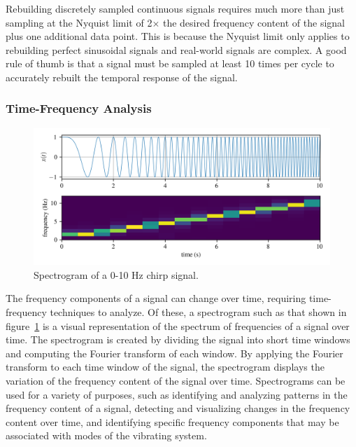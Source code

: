 \documentclass[12pt,letter]{article}
\begin{document}
Rebuilding discretely sampled continuous signals requires much more than just sampling at the Nyquist limit of 2$\times$ the desired frequency content of the signal plus one additional data point. This is because the Nyquist limit only applies to rebuilding perfect sinusoidal signals and real-world signals are complex. A good rule of thumb is that a signal must be sampled at least 10 times per cycle to accurately rebuilt the temporal response of the signal.

\subsubsection{Time-Frequency Analysis}


\begin{figure}[H]
    \centering
    \includegraphics[width=6.5in]{../figures/spectrogram.png}
    \caption{Spectrogram of a 0-10 Hz chirp signal.}
    \label{fig:spectrogram}
\end{figure}

The frequency components of a signal can change over time, requiring time-frequency techniques to analyze. Of these, a spectrogram such as that shown in figure~\ref{fig:spectrogram} is a visual representation of the spectrum of frequencies of a signal over time. The spectrogram is created by dividing the signal into short time windows and computing the Fourier transform of each window.  By applying the Fourier transform to each time window of the signal, the spectrogram displays the variation of the frequency content of the signal over time. Spectrograms can be used for a variety of purposes, such as identifying and analyzing patterns in the frequency content of a signal, detecting and visualizing changes in the frequency content over time, and identifying specific frequency components that may be associated with modes of the vibrating system.





\end{document}
